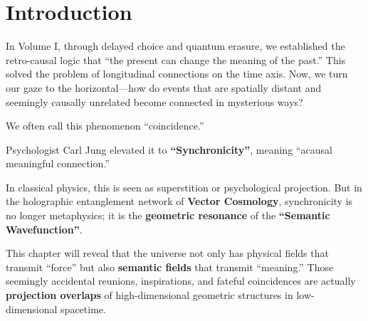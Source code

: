\section{Introduction}

In Volume I, through delayed choice and quantum erasure, we established the retro-causal logic that ``the present can change the meaning of the past.'' This solved the problem of longitudinal connections on the time axis. Now, we turn our gaze to the horizontal---how do events that are spatially distant and seemingly causally unrelated become connected in mysterious ways?

We often call this phenomenon ``coincidence.''

Psychologist Carl Jung elevated it to \textbf{``Synchronicity''}, meaning ``acausal meaningful connection.''

In classical physics, this is seen as superstition or psychological projection. But in the holographic entanglement network of \textbf{Vector Cosmology}, synchronicity is no longer metaphysics; it is the \textbf{geometric resonance} of the \textbf{``Semantic Wavefunction''}.

This chapter will reveal that the universe not only has physical fields that transmit ``force'' but also \textbf{semantic fields} that transmit ``meaning.'' Those seemingly accidental reunions, inspirations, and fateful coincidences are actually \textbf{projection overlaps} of high-dimensional geometric structures in low-dimensional spacetime.

